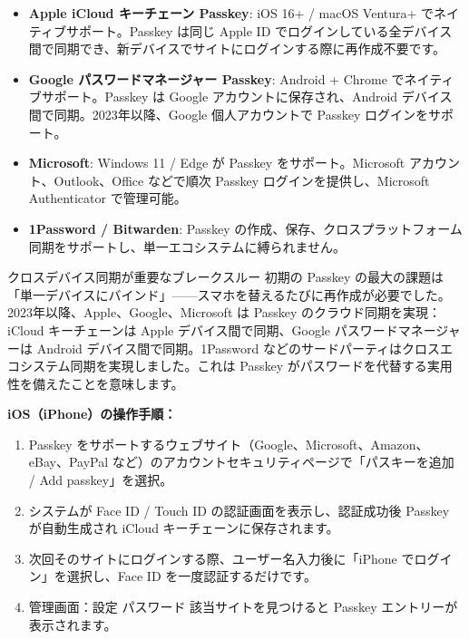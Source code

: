 \begin{itemize}
  \item \textbf{Apple iCloud キーチェーン Passkey}: iOS 16+ / macOS Ventura+ でネイティブサポート。Passkey は同じ Apple ID でログインしている全デバイス間で同期でき、新デバイスでサイトにログインする際に再作成不要です。
  \item \textbf{Google パスワードマネージャー Passkey}: Android + Chrome でネイティブサポート。Passkey は Google アカウントに保存され、Android デバイス間で同期。2023年以降、Google 個人アカウントで Passkey ログインをサポート。
  \item \textbf{Microsoft}: Windows 11 / Edge が Passkey をサポート。Microsoft アカウント、Outlook、Office などで順次 Passkey ログインを提供し、Microsoft Authenticator で管理可能。
  \item \textbf{1Password / Bitwarden}: Passkey の作成、保存、クロスプラットフォーム同期をサポートし、単一エコシステムに縛られません。
\end{itemize}

\begin{tcbinfo}{クロスデバイス同期が重要なブレークスルー}
初期の Passkey の最大の課題は「単一デバイスにバインド」——スマホを替えるたびに再作成が必要でした。2023年以降、Apple、Google、Microsoft は Passkey のクラウド同期を実現：iCloud キーチェーンは Apple デバイス間で同期、Google パスワードマネージャーは Android デバイス間で同期。1Password などのサードパーティはクロスエコシステム同期を実現しました。これは Passkey がパスワードを代替する実用性を備えたことを意味します。

\end{tcbinfo}


\textbf{iOS（iPhone）の操作手順：}

\begin{enumerate}
  \item Passkey をサポートするウェブサイト（Google、Microsoft、Amazon、eBay、PayPal など）のアカウントセキュリティページで「パスキーを追加 / Add passkey」を選択。
  \item システムが Face ID / Touch ID の認証画面を表示し、認証成功後 Passkey が自動生成され iCloud キーチェーンに保存されます。
  \item 次回そのサイトにログインする際、ユーザー名入力後に「iPhone でログイン」を選択し、Face ID を一度認証するだけです。
  \item 管理画面：設定 パスワード 該当サイトを見つけると Passkey エントリーが表示されます。
\end{enumerate}

